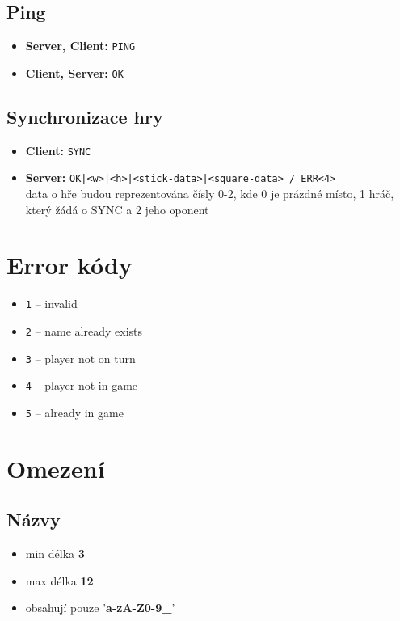 \documentclass[11pt,a4paper]{article}
\begin{document}
\subsection*{Ping}
\begin{itemize}
	\item \textbf{Server, Client:} \texttt{PING}
	\item \textbf{Client, Server:} \texttt{OK}
\end{itemize}

\subsection*{Synchronizace hry}
\begin{itemize}
	\item \textbf{Client:} \texttt{SYNC}
	\item \textbf{Server:} \texttt{OK|<w>|<h>|<stick-data>|<square-data> / ERR<4>}
	\\ data o hře budou reprezentována čísly 0-2, kde 0 je prázdné místo, 1 hráč, který žádá o SYNC a 2 jeho oponent
\end{itemize}

\section{Error kódy}
\begin{itemize}
	\item \texttt{1} -- invalid
	\item \texttt{2} -- name already exists
	\item \texttt{3} -- player not on turn
	\item \texttt{4} -- player not in game
	\item \texttt{5} -- already in game
\end{itemize}

\section{Omezení}
\subsection{Názvy}
\begin{itemize}
	\item min délka \textbf{3}
	\item max délka \textbf{12}
	\item obsahují pouze '\textbf{a-zA-Z0-9\_}'
\end{itemize}
\end{document}

